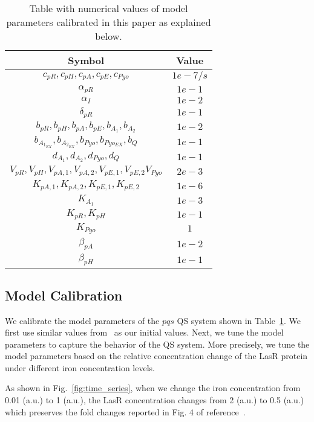 \documentclass[runningheads]{llncs}
\begin{document}
\begin{table}[!h]
\centering
\begin{tabular}{|c|c|}
\hline
\bf Symbol  & Value \\ \hline
  $c_{pR}, c_{pH}, c_{pA}, c_{pE}, c_{Pyo}$ & $1e-7/s$  \\ \hline 
  $\alpha_{pR}$ & $1e-1$  \\ \hline
  $\alpha_{I}$ & $1e-2$  \\ \hline
  $\delta_{pR}$ & $1e-1$  \\ \hline
  $b_{pR}, b_{pH}, b_{pA}, b_{pE}, b_{A_1}, b_{A_2}  $ & $1e-2$  \\ \hline
    $b_{A_{1_{EX}}}, b_{A_{2_{EX}}}, b_{Pyo}, b_{Pyo_{EX}}, b_{Q}  $ & $1e-1$\\ \hline
      $d_{A_1}, d_{A_2}, d_{Pyo}, d_{Q}$ & $1e-1$  \\ \hline
   $V_{pR}, V_{pH}, V_{pA,1}, V_{pA,2}, V_{pE,1}, V_{pE,2} V_{Pyo}  $ & $2e-3$  \\ \hline
   $K_{pA,1}, K_{pA, 2}, K_{pE,1}, K_{pE,2}$ & $1e-6$  \\ \hline
   $K_{A_1}$ & $1e-3$ \\ \hline
   $K_{pR}, K_{pH}$ & $1e-1$  \\ \hline
   $K_{Pyo}$ & $1$ \\ \hline
   $\beta_{pA}$ & $1e-2$   \\ \hline
   $\beta_{pH}$ & $1e-1$  \\ \hline
\end{tabular}
\caption{\label{values2} Table with numerical values of model parameters calibrated in this paper as explained below.}
\end{table}




\subsection*{Model Calibration}
We calibrate the model parameters of the $pqs$ QS system shown in Table~\ref{values2}. We first use similar values from~\cite{Melke2010}\cite{Fagerlind2005} as our initial values. Next, we tune the model parameters to capture the behavior of the QS system. More precisely, we tune the model parameters based on the relative concentration change of the LasR protein under different iron concentration levels. 
 
 As shown in Fig.~\ref{fig:time_series}, when we change the iron concentration from 0.01 (a.u.) to 1 (a.u.), the LasR concentration changes from 2 (a.u.) to 0.5 (a.u.) which preserves the fold changes reported in Fig. 4 of reference~\cite{Kim2005}.
\end{document}
